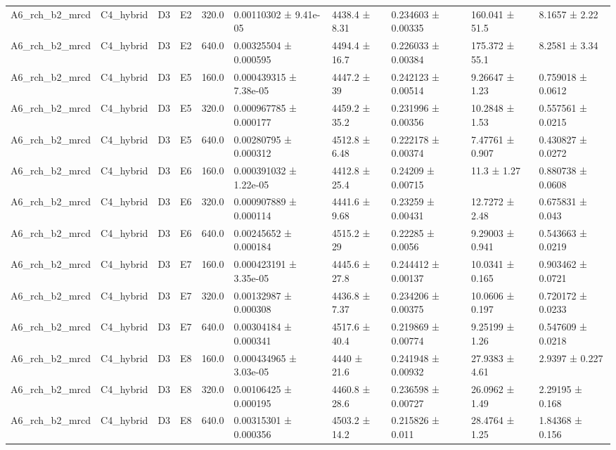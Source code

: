 \begin{table}
\begin{tabular}{llllllllll}
A6\_rch\_b2\_mrcd & C4\_hybrid & D3 & E2 & 320.0 & 0.00110302 ± 9.41e-05 & 4438.4 ± 8.31 & 0.234603 ± 0.00335 & 160.041 ± 51.5 & 8.1657 ± 2.22 \\
A6\_rch\_b2\_mrcd & C4\_hybrid & D3 & E2 & 640.0 & 0.00325504 ± 0.000595 & 4494.4 ± 16.7 & 0.226033 ± 0.00384 & 175.372 ± 55.1 & 8.2581 ± 3.34 \\
A6\_rch\_b2\_mrcd & C4\_hybrid & D3 & E5 & 160.0 & 0.000439315 ± 7.38e-05 & 4447.2 ± 39 & 0.242123 ± 0.00514 & 9.26647 ± 1.23 & 0.759018 ± 0.0612 \\
A6\_rch\_b2\_mrcd & C4\_hybrid & D3 & E5 & 320.0 & 0.000967785 ± 0.000177 & 4459.2 ± 35.2 & 0.231996 ± 0.00356 & 10.2848 ± 1.53 & 0.557561 ± 0.0215 \\
A6\_rch\_b2\_mrcd & C4\_hybrid & D3 & E5 & 640.0 & 0.00280795 ± 0.000312 & 4512.8 ± 6.48 & 0.222178 ± 0.00374 & 7.47761 ± 0.907 & 0.430827 ± 0.0272 \\
A6\_rch\_b2\_mrcd & C4\_hybrid & D3 & E6 & 160.0 & 0.000391032 ± 1.22e-05 & 4412.8 ± 25.4 & 0.24209 ± 0.00715 & 11.3 ± 1.27 & 0.880738 ± 0.0608 \\
A6\_rch\_b2\_mrcd & C4\_hybrid & D3 & E6 & 320.0 & 0.000907889 ± 0.000114 & 4441.6 ± 9.68 & 0.23259 ± 0.00431 & 12.7272 ± 2.48 & 0.675831 ± 0.043 \\
A6\_rch\_b2\_mrcd & C4\_hybrid & D3 & E6 & 640.0 & 0.00245652 ± 0.000184 & 4515.2 ± 29 & 0.22285 ± 0.0056 & 9.29003 ± 0.941 & 0.543663 ± 0.0219 \\
A6\_rch\_b2\_mrcd & C4\_hybrid & D3 & E7 & 160.0 & 0.000423191 ± 3.35e-05 & 4445.6 ± 27.8 & 0.244412 ± 0.00137 & 10.0341 ± 0.165 & 0.903462 ± 0.0721 \\
A6\_rch\_b2\_mrcd & C4\_hybrid & D3 & E7 & 320.0 & 0.00132987 ± 0.000308 & 4436.8 ± 7.37 & 0.234206 ± 0.00375 & 10.0606 ± 0.197 & 0.720172 ± 0.0233 \\
A6\_rch\_b2\_mrcd & C4\_hybrid & D3 & E7 & 640.0 & 0.00304184 ± 0.000341 & 4517.6 ± 40.4 & 0.219869 ± 0.00774 & 9.25199 ± 1.26 & 0.547609 ± 0.0218 \\
A6\_rch\_b2\_mrcd & C4\_hybrid & D3 & E8 & 160.0 & 0.000434965 ± 3.03e-05 & 4440 ± 21.6 & 0.241948 ± 0.00932 & 27.9383 ± 4.61 & 2.9397 ± 0.227 \\
A6\_rch\_b2\_mrcd & C4\_hybrid & D3 & E8 & 320.0 & 0.00106425 ± 0.000195 & 4460.8 ± 28.6 & 0.236598 ± 0.00727 & 26.0962 ± 1.49 & 2.29195 ± 0.168 \\
A6\_rch\_b2\_mrcd & C4\_hybrid & D3 & E8 & 640.0 & 0.00315301 ± 0.000356 & 4503.2 ± 14.2 & 0.215826 ± 0.011 & 28.4764 ± 1.25 & 1.84368 ± 0.156 \\

\end{tabular}
\end{table}
